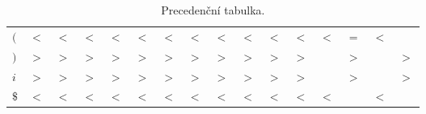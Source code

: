 \documentclass[a4paper, 12pt]{article}
\begin{document}
\begin{table}[h]
\begin{tabular}[p]{| l | c | c | c | c | c | c | c | c | c | c | c | c | c | c | c |}
            \textbf{$($} &
                $<$ & $<$ & $<$ & $<$ & $<$ & $<$ & $<$ & $<$ & $<$ & $<$ & $<$ & $<$ & $=$ & $<$ &     \\ 
            \textbf{$)$} &
                $>$ & $>$ & $>$ & $>$ & $>$ & $>$ & $>$ & $>$ & $>$ & $>$ & $>$ &     & $>$ &     & $>$ \\ 
            \textbf{$i$} &
                $>$ & $>$ & $>$ & $>$ & $>$ & $>$ & $>$ & $>$ & $>$ & $>$ & $>$ &     & $>$ &     & $>$ \\ 
            \textbf{$\$$} &
                $<$ & $<$ & $<$ & $<$ & $<$ & $<$ & $<$ & $<$ & $<$ & $<$ & $<$ & $<$ &     & $<$ &     \\ 
            \hline
        \end{tabular}
        \caption{Precedenční tabulka.}
        \label{tabulka precedence}
    \end{table}

    \newpage
	\renewcommand{\refname}{Zdroje}
	\printbibliography
\end{document}

